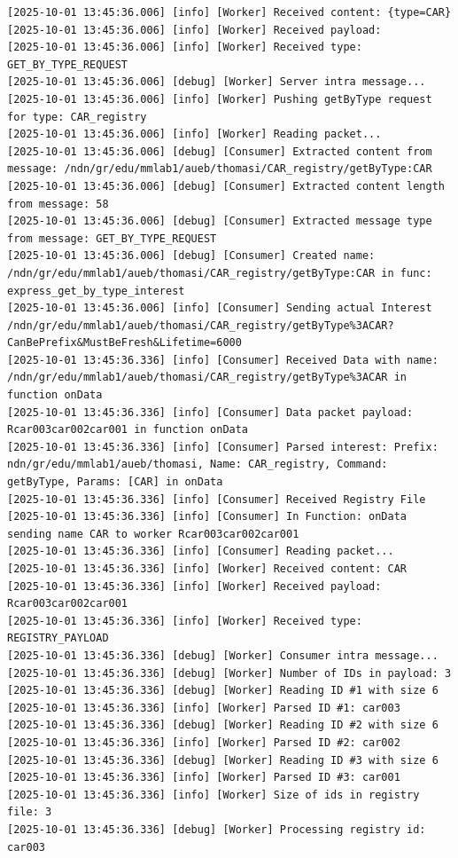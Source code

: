 \documentclass{article}
\begin{document}
\begin{lstlisting}[language=log, caption={Logs of the SeEDS Service of the \emph{UMemphis} node, after getting a response from \emph{GET by TYPE}}, label={lst:get-by-type-umemphis}]
[2025-10-01 13:45:36.006] [info] [Worker] Received content: {type=CAR}
[2025-10-01 13:45:36.006] [info] [Worker] Received payload: 
[2025-10-01 13:45:36.006] [info] [Worker] Received type: GET_BY_TYPE_REQUEST
[2025-10-01 13:45:36.006] [debug] [Worker] Server intra message...
[2025-10-01 13:45:36.006] [info] [Worker] Pushing getByType request for type: CAR_registry
[2025-10-01 13:45:36.006] [info] [Worker] Reading packet...
[2025-10-01 13:45:36.006] [debug] [Consumer] Extracted content from message: /ndn/gr/edu/mmlab1/aueb/thomasi/CAR_registry/getByType:CAR
[2025-10-01 13:45:36.006] [debug] [Consumer] Extracted content length from message: 58
[2025-10-01 13:45:36.006] [debug] [Consumer] Extracted message type from message: GET_BY_TYPE_REQUEST
[2025-10-01 13:45:36.006] [debug] [Consumer] Created name: /ndn/gr/edu/mmlab1/aueb/thomasi/CAR_registry/getByType:CAR in func: express_get_by_type_interest
[2025-10-01 13:45:36.006] [info] [Consumer] Sending actual Interest /ndn/gr/edu/mmlab1/aueb/thomasi/CAR_registry/getByType%3ACAR?CanBePrefix&MustBeFresh&Lifetime=6000
[2025-10-01 13:45:36.336] [info] [Consumer] Received Data with name: /ndn/gr/edu/mmlab1/aueb/thomasi/CAR_registry/getByType%3ACAR in function onData
[2025-10-01 13:45:36.336] [info] [Consumer] Data packet payload: Rcar003car002car001 in function onData
[2025-10-01 13:45:36.336] [info] [Consumer] Parsed interest: Prefix: ndn/gr/edu/mmlab1/aueb/thomasi, Name: CAR_registry, Command: getByType, Params: [CAR] in onData
[2025-10-01 13:45:36.336] [info] [Consumer] Received Registry File
[2025-10-01 13:45:36.336] [info] [Consumer] In Function: onData sending name CAR to worker Rcar003car002car001
[2025-10-01 13:45:36.336] [info] [Consumer] Reading packet...
[2025-10-01 13:45:36.336] [info] [Worker] Received content: CAR
[2025-10-01 13:45:36.336] [info] [Worker] Received payload: Rcar003car002car001
[2025-10-01 13:45:36.336] [info] [Worker] Received type: REGISTRY_PAYLOAD
[2025-10-01 13:45:36.336] [debug] [Worker] Consumer intra message...
[2025-10-01 13:45:36.336] [debug] [Worker] Number of IDs in payload: 3
[2025-10-01 13:45:36.336] [debug] [Worker] Reading ID #1 with size 6
[2025-10-01 13:45:36.336] [info] [Worker] Parsed ID #1: car003
[2025-10-01 13:45:36.336] [debug] [Worker] Reading ID #2 with size 6
[2025-10-01 13:45:36.336] [info] [Worker] Parsed ID #2: car002
[2025-10-01 13:45:36.336] [debug] [Worker] Reading ID #3 with size 6
[2025-10-01 13:45:36.336] [info] [Worker] Parsed ID #3: car001
[2025-10-01 13:45:36.336] [info] [Worker] Size of ids in registry file: 3
[2025-10-01 13:45:36.336] [debug] [Worker] Processing registry id: car003

\end{lstlisting}
\end{document}
